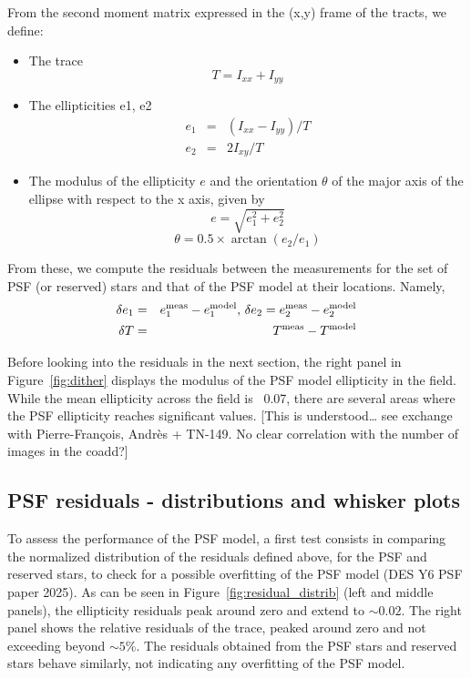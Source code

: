 \documentclass[SE,lsstdraft,authoryear,toc]{lsstdoc}
\begin{document}
From the second moment matrix expressed in the (x,y) frame of the tracts, we define:
\begin{itemize}
\item The trace 
\begin{equation}
T = I_{xx} + I_{yy}
\end{equation}

\item The ellipticities e1, e2
\begin{eqnarray}
  e_1 &=& (I_{xx} - I_{yy})/T \\
  e_2 &=& 2 I_{xy} / T
\end{eqnarray}

\item The modulus of the ellipticity $e$ and the orientation $\theta$ of the major axis of the ellipse with respect to the x axis, given by
\begin{equation} 
e = \sqrt{e_1^2 + e_2^2}
\label{eq:modulus}
\end{equation}
\begin{equation}
\theta = 0.5 \times \arctan(e_2/e_1)
\label{eq:theta}
\end{equation}
\end{itemize}


From these, we compute the residuals between the measurements for the set of PSF (or reserved) stars and that of the PSF model at their locations.  Namely,
\begin{eqnarray}
\delta e_1 &=& e_1^{\rm meas} - e_1^{\rm model}, \, \delta e_2 = e_2^{\rm meas} - e_2^{\rm model}\\
\delta T &=& T^{\rm meas} - T^{\rm model} 
\end{eqnarray}

Before looking into the residuals in the next section, the right panel in Figure~\ref{fig:dither} displays the modulus of the PSF model ellipticity in the field. While the mean ellipticity across the field is ~0.07, there are several areas where the PSF ellipticity reaches significant values. [This is understood… see exchange with Pierre-François, Andrès  + TN-149. No clear correlation with the number of images in the coadd?]  


\subsection{PSF residuals - distributions and whisker plots}
To assess the performance of the PSF model, a first test consists in comparing the normalized distribution of the residuals defined above, for the PSF and reserved stars, to check for a possible overfitting of the PSF model (DES Y6 PSF paper 2025). As can be seen in Figure~\ref{fig:residual_distrib} (left and middle panels), the ellipticity residuals peak around zero and extend to $\sim 0.02$. The right panel shows the relative residuals of the trace, peaked around zero and not exceeding beyond $\sim 5 \%$. The residuals obtained from the PSF stars and reserved stars behave similarly, not indicating any overfitting of the PSF model.
\end{document}
